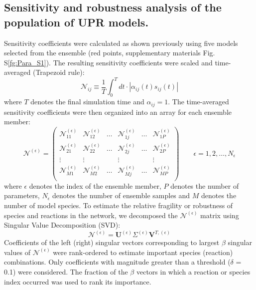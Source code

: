 \documentclass[fleqn,10pt]{wlscirep}
\begin{document}
\subsection*{Sensitivity and robustness analysis of the population of UPR models.}
Sensitivity coefficients were calculated as shown previously \cite{Song:2010ij} using five models selected from the ensemble (red points, supplementary materials Fig. S\ref{fg:Para_S1}).
The resulting sensitivity coefficients were scaled and time-averaged (Trapezoid rule):
\begin{equation}\label{eqn_INsen}
	\mathcal{N}_{ij} \equiv \frac{1}{T}\int^{T}_{0} dt \cdot |\alpha_{ij}\left(t\right)s_{ij}(t)|
\end{equation}
where $T$ denotes the final simulation time and $\alpha_{ij}=1$.
The time-averaged sensitivity coefficients were then organized into an array for each ensemble member:
\begin{equation}
	\mathcal{N}^{\left(\epsilon\right)} =
	\begin{pmatrix}
		\mathcal{N}_{11}^{\left(\epsilon\right)} & \mathcal{N}_{12}^{\left(\epsilon\right)} & \hdots & \mathcal{N}_{1j}^{\left(\epsilon\right)} & \hdots & \mathcal{N}_{1P}^{\left(\epsilon\right)} \\
		\mathcal{N}_{21}^{\left(\epsilon\right)} & \mathcal{N}_{22}^{\left(\epsilon\right)} & \hdots & \mathcal{N}_{2j}^{\left(\epsilon\right)} & \hdots & \mathcal{N}_{2P}^{\left(\epsilon\right)} \\
		\vdots & \vdots & & \vdots & & \vdots \\
		\mathcal{N}_{M1}^{\left(\epsilon\right)} & \mathcal{N}_{M2}^{\left(\epsilon\right)} & \hdots & \mathcal{N}_{Mj}^{\left(\epsilon\right)} & \hdots & \mathcal{N}_{MP}^{\left(\epsilon\right)} \\
	\end{pmatrix}\qquad\epsilon = 1,2,\hdots,N_{\epsilon}
\end{equation}
where $\epsilon$ denotes the index of the ensemble member, $P$ denotes the number of parameters, $N_{\epsilon}$ denotes the number of ensemble samples and $M$ denotes the number of model species.
To estimate the relative fragility or robustness of species and reactions in the network, we decomposed the $\mathcal{N}^{\left(\epsilon\right)}$ matrix
using Singular Value Decomposition (SVD):
\begin{equation}
	\mathcal{N}^{\left(\epsilon\right)} = \mathbf{U}^{\left(\epsilon\right)}\Sigma^{\left(\epsilon\right)}\mathbf{V}^{T,{\left(\epsilon\right)}}
\end{equation}
Coefficients of the left (right) singular vectors corresponding to largest $\beta$ singular values of $\mathcal{N}^{\left(\epsilon\right)}$
were rank-ordered to estimate important species (reaction) combinations. Only coefficients with magnitude greater than a threshold ($\delta$ = 0.1) were considered.
The fraction of the $\beta$ vectors in which a reaction or species index occurred was used to rank its importance.
\end{document}
